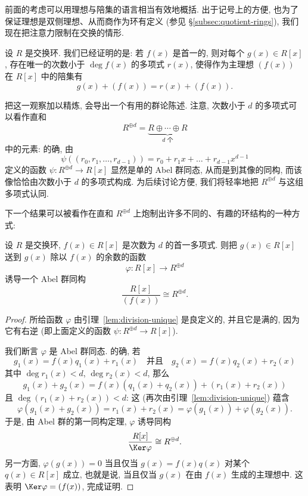 前面的考虑可以用理想与陪集的语言相当有效地概括. 出于记号上的方便, 也为了保证理想是双侧理想、从而商作为环有定义 (参见 \S\ref{subsec:quotient-rings}), 我们现在把注意力限制在交换的情形.

设 $R$ 是交换环. 我们已经证明的是: 若 $f(x)$ 是首一的, 则对每个 $g(x) \in R[x]$, 存在唯一的次数小于 $\deg f(x)$ 的多项式 $r(x)$, 使得作为主理想 $(f(x))$ 在 $R[x]$ 中的陪集有
\[
g(x) + (f(x)) = r(x) + (f(x)).
\]

把这一观察加以精炼, 会导出一个有用的群论陈述. 注意, 次数小于 $d$ 的多项式可以看作直和
\[
R^{\oplus d} = \underbrace{R \oplus \cdots \oplus R}_{d \text{ 个}}
\]
中的元素: 的确, 由
\[
\psi((r_0, r_1, \dots, r_{d-1})) = r_0 + r_1 x + \dots + r_{d-1} x^{d-1}
\]
定义的函数 $\psi : R^{\oplus d} \to R[x]$ 显然是单的 Abel 群同态, 从而是到其像的同构, 而该像恰恰由次数小于 $d$ 的多项式构成. 为后续讨论方便, 我们将轻率地把 $R^{\oplus d}$ 与这组多项式认同.

下一个结果可以被看作在直和 $R^{\oplus d}$ 上炮制出许多不同的、有趣的环结构的一种方式:

\begin{proposition}
\label{prop:quotient-poly}
设 $R$ 是交换环, $f(x) \in R[x]$ 是次数为 $d$ 的首一多项式. 则把 $g(x) \in R[x]$ 送到 $g(x)$ 除以 $f(x)$ 的余数的函数
\[
\varphi : R[x] \to R^{\oplus d}
\]
诱导一个 Abel 群同构
\[
\frac{R[x]}{(f(x))} \cong R^{\oplus d}.
\]
\end{proposition}

\begin{proof}
所给函数 $\varphi$ 由引理~\ref{lem:division-unique} 是良定义的, 并且它是满的, 因为它有右逆 (即上面定义的函数 $\psi : R^{\oplus d} \to R[x]$).

我们断言 $\varphi$ 是 Abel 群同态. 的确, 若
\[
g_1(x) = f(x)q_1(x) + r_1(x) \quad \text{并且} \quad g_2(x) = f(x)q_2(x) + r_2(x)
\]
其中 $\deg r_1(x) < d$, $\deg r_2(x) < d$, 那么
\[
g_1(x) + g_2(x) = f(x)(q_1(x) + q_2(x)) + (r_1(x) + r_2(x))
\]
且 $\deg(r_1(x) + r_2(x)) < d$: 这 (再次由引理~\ref{lem:division-unique}) 蕴含
\[
\varphi(g_1(x) + g_2(x)) = r_1(x) + r_2(x) = \varphi(g_1(x)) + \varphi(g_2(x)).
\]
于是, 由 Abel 群的第一同构定理, $\varphi$ 诱导同构
\[
\frac{R[x]}{\Ker \varphi} \cong R^{\oplus d}.
\]
另一方面, $\varphi(g(x)) = 0$ 当且仅当 $g(x) = f(x)q(x)$ 对某个 $q(x) \in R[x]$ 成立, 也就是说, 当且仅当 $g(x)$ 在由 $f(x)$ 生成的主理想中. 这表明 $\Ker \varphi = (f(x))$, 完成证明.
\end{proof}

